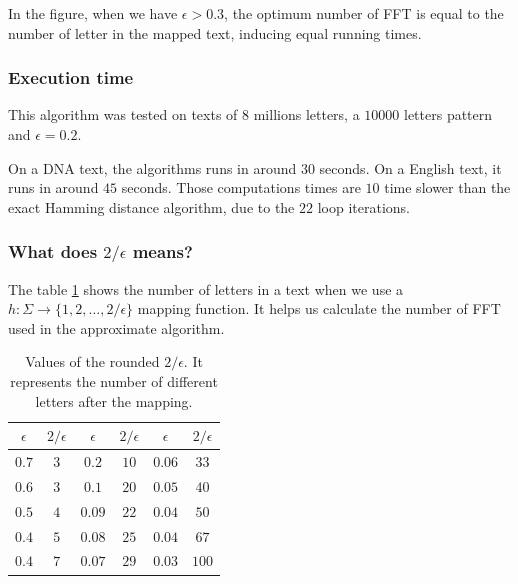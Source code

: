 \documentclass[preprint,12pt]{elsarticle}
\begin{document}
In the figure, when we have $\epsilon > 0.3$,
the optimum number of FFT is equal to the number of letter in the mapped text,
inducing equal running times.



\subsubsection*{Execution time}

This algorithm was tested on texts of $8$ millions letters,
a $10 000$ letters pattern and $\epsilon = 0.2$.

On a DNA text, the algorithms runs in around $30$ seconds.
On a English text, it runs in around $45$ seconds.
Those computations times are $10$ time slower than the exact Hamming distance algorithm,
due to the $22$ loop iterations.



\subsubsection*{What does $2/\epsilon$ means?}

The table \ref{TableEpsilon} shows the number of letters in a text
when we use a $h: \Sigma \rightarrow \{1, 2, \ldots, 2/\epsilon\}$ mapping function.
It helps us calculate the number of FFT used in the approximate algorithm.


\begin{table}[h]
\centering
\begin{tabular}{|c|c||c|c||c|c|}
\hline
$\epsilon$ & $2/ \epsilon$ & $\epsilon$ & $2/ \epsilon$ & $\epsilon$ & $2/ \epsilon$ \\ \hline
$0.7$ & $3$ & $0.2$ & $10$ & $0.06$ & $33$ \\ \hline
$0.6$ & $3$ & $0.1$ & $20$ & $0.05$ & $40$ \\ \hline
$0.5$ & $4$ & $0.09$ & $22$ & $0.04$ & $50$ \\ \hline
$0.4$ & $5$ & $0.08$ & $25$ & $0.04$ & $67$ \\ \hline
$0.4$ & $7$ & $0.07$ & $29$ & $0.03$ & $100$ \\ \hline
\end{tabular}
\caption{Values of the rounded $2 / \epsilon$.
It represents the number of different letters after the mapping.}
\label{TableEpsilon}
\end{table}
\end{document}
